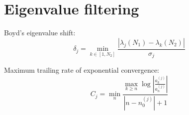\section{Eigenvalue filtering}

Boyd's eigenvalue shift:
\begin{equation}
    \delta_j = \min_{k\in[1, N_2]} \frac{\left|\lambda_j(N_1) - \lambda_k(N_2)\right|}{\sigma_j}
\end{equation}

Maximum trailing rate of exponential convergence:
\begin{equation}
    C_j = \min_{n} \frac{\max_{k\geq n} \log\left|\frac{a_k^{(j)}}{a_n^{(j)}}\right|}{\left|n - n_0^{(j)}\right| + 1}
\end{equation}
